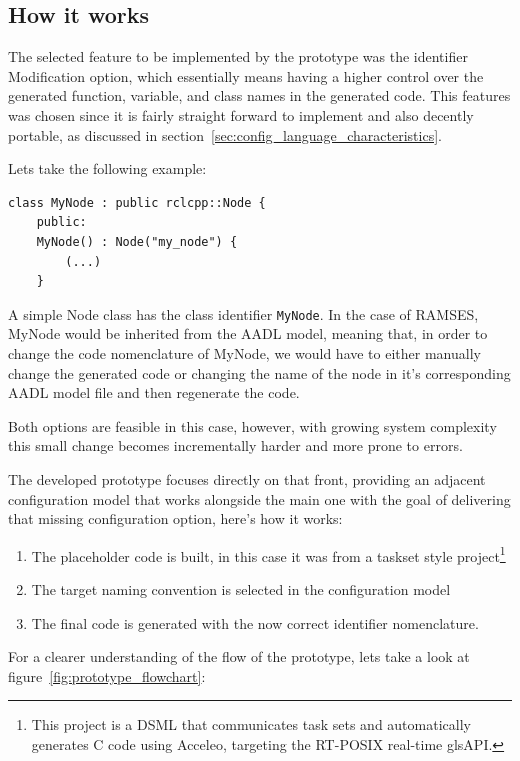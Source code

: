 \subsection{How it works}
\label{sec:how_it_works}

The selected feature to be implemented by the prototype was the \Gls{identifier} Modification option, which essentially means having a higher control over the generated function, variable, and class names in the generated code. This features was chosen since it is fairly straight forward to implement and also decently portable, as discussed in section~\ref{sec:config_language_characteristics}. 

Lets take the following example:

\begin{verbatim}
class MyNode : public rclcpp::Node {
	public:
	MyNode() : Node("my_node") {
		(...)
	}
\end{verbatim}

A simple Node class has the class \gls{identifier} \texttt{MyNode}. In the case of \gls{RAMSES}, MyNode would be inherited from the \gls{AADL} model, meaning that, in order to change the code nomenclature of MyNode, we would have to either manually change the generated code or changing the name of the node in it's corresponding \gls{AADL} model file and then regenerate the code.

Both options are feasible in this case, however, with growing system complexity this small change becomes incrementally harder and more prone to errors.

The developed prototype focuses directly on that front, providing an adjacent configuration model that works alongside the main one with the goal of delivering that missing configuration option, here's how it works:

\begin{enumerate}
	\item The placeholder code is built, in this case it was from a taskset style project\footnote{This project is a \gls{DSML} that communicates task sets and automatically generates C code using Acceleo, targeting the RT-POSIX real-time gls{API}.}
	\item The target naming convention is selected in the configuration model
	\item The final code is generated with the now correct \gls{identifier} nomenclature.
\end{enumerate}
 
 
For a clearer understanding of the flow of the prototype, lets take a look at figure~\ref{fig:prototype_flowchart}:

